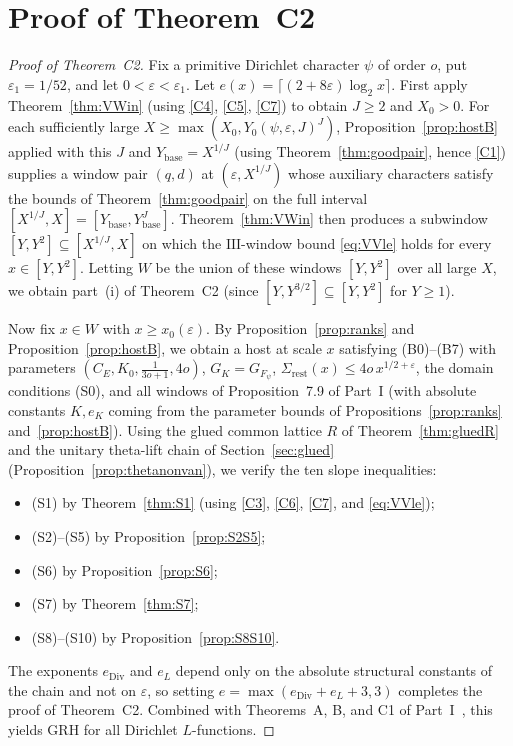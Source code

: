 \documentclass[11pt]{amsart}
\newcommand{\eps}{\varepsilon}
\newcommand{\Sha}{\mathrm{III}}
\theoremstyle{plain}
\theoremstyle{definition}
\numberwithin{equation}{section}
\begin{document}
\section{Proof of Theorem~C2}\label{sec:assembly}

\begin{proof}[Proof of Theorem~C2]
Fix a primitive Dirichlet character $\psi$ of order $o$, put $\eps_1=1/52$, and let
$0<\eps<\eps_1$. Let $e(x)=\lceil(2+8\eps)\log_2 x\rceil$. First apply Theorem~\ref{thm:VWin}
(using \ref{C4}, \ref{C5}, \ref{C7}) to obtain $J\ge2$ and $X_0>0$. For each sufficiently large
$X\ge\max(X_0, Y_0(\psi,\eps,J)^J)$, Proposition~\ref{prop:hostB} applied with this $J$ and
$Y_{\mathrm{base}}=X^{1/J}$ (using Theorem~\ref{thm:goodpair}, hence \ref{C1}) supplies a window
pair $(q,d)$ at $(\eps,X^{1/J})$ whose auxiliary characters satisfy the bounds of
Theorem~\ref{thm:goodpair} on the full interval
$[X^{1/J},X]=[Y_{\mathrm{base}},Y_{\mathrm{base}}^J]$. Theorem~\ref{thm:VWin} then produces a
subwindow $[Y,Y^2]\subseteq[X^{1/J},X]$ on which the $\Sha$-window bound \eqref{eq:VVle} holds for
every $x\in[Y,Y^2]$. Letting $W$ be the union of these windows $[Y,Y^2]$ over all large $X$, we
obtain part~(i) of Theorem~C2 (since $[Y,Y^{3/2}]\subseteq[Y,Y^2]$ for $Y\ge1$).

Now fix $x\in W$ with $x\ge x_0(\eps)$. By Proposition~\ref{prop:ranks} and
Proposition~\ref{prop:hostB}, we obtain a host at scale $x$ satisfying
\textup{(B0)--(B7)} with parameters $(C_E,K_0,\frac1{3o+1},4o)$, $G_K=G_{F_\psi}$,
$\Sigma_{\mathrm{rest}}(x)\le 4o\,x^{1/2+\eps}$, the domain conditions \textup{(S0)}, and all
windows of Proposition~7.9 of Part~I (with absolute constants $K,e_K$ coming from the parameter
bounds of Propositions~\ref{prop:ranks} and~\ref{prop:hostB}). Using the glued common lattice $R$ of Theorem~\ref{thm:gluedR} and the unitary theta-lift chain of
Section~\ref{sec:glued} (Proposition~\ref{prop:thetanonvan}), we verify the ten slope inequalities:
\begin{itemize}
\item \textup{(S1)} by Theorem~\ref{thm:S1} (using \ref{C3}, \ref{C6}, \ref{C7}, and
  \eqref{eq:VVle});
\item \textup{(S2)--(S5)} by Proposition~\ref{prop:S2S5};
\item \textup{(S6)} by Proposition~\ref{prop:S6};
\item \textup{(S7)} by Theorem~\ref{thm:S7};
\item \textup{(S8)--(S10)} by Proposition~\ref{prop:S8S10}.
\end{itemize}
The exponents $e_{\mathrm{Div}}$ and $e_L$ depend only on the absolute structural constants of the
chain and not on $\eps$, so setting $e=\max(e_{\mathrm{Div}}+e_L+3,3)$ completes the proof of
Theorem~C2. Combined with Theorems~A, B, and C1 of Part~I~\cite{dixit-part1}, this yields GRH for
all Dirichlet $L$-functions.
\end{proof}
\end{document}
